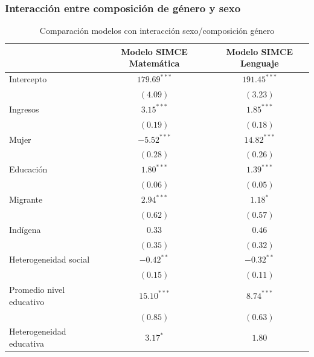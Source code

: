 \documentclass[
]{article}
\begin{document}
\hypertarget{interacciuxf3n-entre-composiciuxf3n-de-guxe9nero-y-sexo}{%
\subsubsection{Interacción entre composición de género y
sexo}\label{interacciuxf3n-entre-composiciuxf3n-de-guxe9nero-y-sexo}}

\begin{table}
\caption{Comparación modelos con interacción sexo/composición género}
\begin{center}
\begin{tabular}{l c c}
\hline
 & Modelo SIMCE Matemática & Modelo SIMCE Lenguaje \\
\hline
Intercepto                       & $179.69^{***}$ & $191.45^{***}$ \\
                                 & $(4.09)$       & $(3.23)$       \\
Ingresos                         & $3.15^{***}$   & $1.85^{***}$   \\
                                 & $(0.19)$       & $(0.18)$       \\
Mujer                            & $-5.52^{***}$  & $14.82^{***}$  \\
                                 & $(0.28)$       & $(0.26)$       \\
Educación                        & $1.80^{***}$   & $1.39^{***}$   \\
                                 & $(0.06)$       & $(0.05)$       \\
Migrante                         & $2.94^{***}$   & $1.18^{*}$     \\
                                 & $(0.62)$       & $(0.57)$       \\
Indígena                         & $0.33$         & $0.46$         \\
                                 & $(0.35)$       & $(0.32)$       \\
Heterogeneidad social            & $-0.42^{**}$   & $-0.32^{**}$   \\
                                 & $(0.15)$       & $(0.11)$       \\
Promedio nivel educativo         & $15.10^{***}$  & $8.74^{***}$   \\
                                 & $(0.85)$       & $(0.63)$       \\
Heterogeneidad educativa         & $3.17^{*}$     & $1.80$         \\

\end{tabular}
\end{center}
\end{table}
\end{document}
